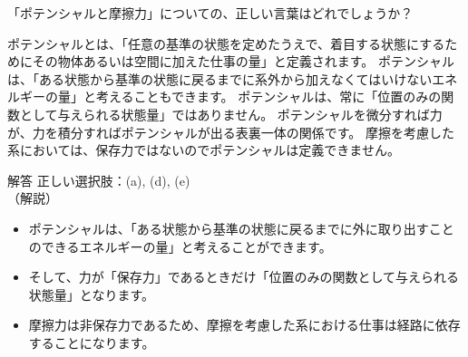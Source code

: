 \documentclass[uplatex,dvipdfmx,a4paper,11pt]{jsarticle}
\begin{document}
\begin{qlist}
	\qitem 「ポテンシャルと摩擦力」についての、正しい言葉はどれでしょうか？
		\begin{qlist2}
			\qitem ポテンシャルとは、「任意の基準の状態を定めたうえで、着目する状態にするためにその物体あるいは空間に加えた仕事の量」と定義されます。
			\qitem ポテンシャルは、「ある状態から基準の状態に戻るまでに系外から加えなくてはいけないエネルギーの量」と考えることもできます。
			\qitem ポテンシャルは、常に「位置のみの関数として与えられる状態量」ではありません。
			\qitem ポテンシャルを微分すれば力が、力を積分すればポテンシャルが出る表裏一体の関係です。
			\qitem 摩擦を考慮した系においては、保存力ではないのでポテンシャルは定義できません。
		\end{qlist2}
        \vspace{3mm}
        \begin{itembox}[l]{解答}
            正しい選択肢：(a), (d), (e)\\
            （解説）
			\begin{itemize}
				\item ポテンシャルは、「ある状態から基準の状態に戻るまでに外に取り出すことのできるエネルギーの量」と考えることができます。
				\item そして、力が「保存力」であるときだけ「位置のみの関数として与えられる状態量」となります。
				\item 摩擦力は非保存力であるため、摩擦を考慮した系における仕事は経路に依存することになります。
			\end{itemize}
        \end{itembox}
\end{qlist}
\end{document}
